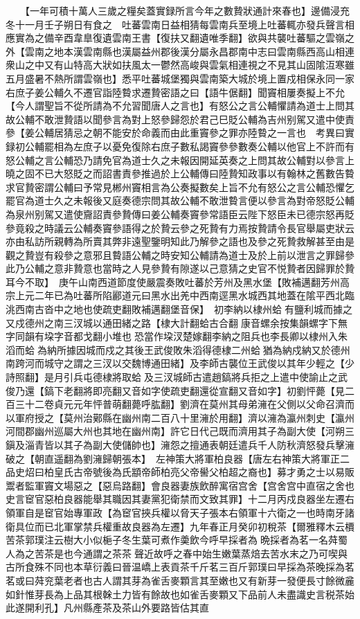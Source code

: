 　　【一年可積十萬人三歲之糧矣蓋實録所言今年之數贄狀通計來春也】邊備浸充　冬十一月壬子朔日有食之　吐蕃雲南日益相猜每雲南兵至境上吐蕃輒亦發兵聲言相應實為之備辛酉韋臯復遺雲南王書【復扶又翻遺唯季翻】欲與共襲吐蕃驅之雲嶺之外【雲南之地本漢雲南縣也漢屬益州郡後漢分屬永昌郡南中志曰雲南縣西高山相連衆山之中又有山特高大狀如扶風太一鬱然高峻與雲氣相連視之不見其山固隂沍寒雖五月盛暑不熱所謂雲嶺也】悉平吐蕃城堡獨與雲南築大城於境上置戍相保永同一家　右庶子姜公輔久不遷官詣陸䞇求遷贄密語之曰【語牛倨翻】聞竇相屢奏擬上不允【今人謂聖旨不從所請為不允習聞唐人之言也】有怒公之言公輔懼請為道士上問其故公輔不敢泄贄語以聞參言為對上怒參歸怨於君己巳貶公輔為吉州别駕又遣中使責參【姜公輔居猜忌之朝不能安於命義而由此重竇參之罪亦陸䞇之一言也　考異曰實録初公輔罷相為左庶子以憂免復除右庶子數私謁竇參參數奏公輔以他官上不許而有怒公輔之言公輔恐乃請免官為道士久之未報因開延英奏之上問其故公輔對以參言上曉之固不已大怒貶之而詔書責參推過於上公輔傳曰陸贄知政事以有翰林之舊數告䞇求官贄密謂公輔曰予常見郴州竇相言為公奏擬數矣上旨不允有怒公之言公輔恐懼乞罷官為道士久之未報後又庭奏德宗問其故公輔不敢泄䞇言便以參言為對帝怒貶公輔為泉州别駕又遣使齎詔責參贄傳曰姜公輔奏竇參常語臣云陛下怒臣未已德宗怒再貶參竟殺之時議云公輔奏竇參語得之於贄云參之死贄有力焉按贄請令長官舉屬吏狀云亦由私訪所親轉為所賣其弊非遠聖鑒明知此乃解參之語也及參之死贄救解甚至由是觀之贄豈有殺參之意邪且䞇語公輔之時安知公輔請為道士及於上前以泄言之罪歸參此乃公輔之意非贄意也當時之人見參贄有隙遂以己意猜之史官不悦贄者因歸罪於贄耳今不取】　庚午山南西道節度使嚴震奏敗吐蕃於芳州及黑水堡【敗補邁翻芳州高宗上元二年已為吐蕃所陷酈道元曰黑水出羌中西南逕黑水城西其地蓋在隂平西北臨洮西南古沓中之地也使疏吏翻敗補邁翻堡音保】　初李納以棣州蛤有鹽利城而據之又戍德州之南三汊城以通田緒之路【棣大計翻蛤古合翻康音螺余按集韻螺字下無字同韻有垜字音都戈翻小堆也恐當作垜汊楚嫁翻李納之阻兵也李長卿以棣州入朱滔而蛤為納所據因城而戍之其後王武俊敗朱滔得德棣二州蛤猶為納戍納又於德州南跨河而城守之謂之三汊以交魏博通田緒】及李師古襲位王武俊以其年少輕之【少詩照翻】是月引兵屯德棣將取蛤及三汊城師古遣趙鎬將兵拒之上遣中使諭止之武俊乃還【鎬下老翻將即亮翻又音如字使疏吏翻還從宣翻又音如字】初劉怦薨【見二百三十二卷貞元元年怦普萌翻薨呼肱翻】劉濟在莫州其母弟澭在父側以父命召濟而以軍府授之【莫州治鄚縣在幽州南二百八十里澭於用翻】濟以澭為瀛州刺史【瀛州河間郡幽州巡屬大州也其地在幽州南】許它日代己既而濟用其子為副大使【河朔三鎭及淄青皆以其子為副大使儲帥也】澭怨之擅通表朝廷遣兵千人防秋濟怒發兵擊澭破之【朝直遥翻為劉澭歸朝張本】　左神策大將軍柏良器【唐左右神策大將軍正二品史炤曰柏皇氏古帝號後為氏顓帝師柏亮父帝嚳父柏超之裔也】募才勇之士以易販鬻者監軍竇文場惡之【惡烏路翻】會良器妻族飲醉寓宿宫舍【宫舍宫中直宿之舍也史言䆠官惡柏良器能舉其職因其妻黨犯衛禁而文致其罪】十二月丙戍良器坐左遷右領軍自是䆠官始專軍政【為䆠官挾兵權以脅天子張本右領軍十六衛之一也時南牙諸衛具位而已北軍掌禁兵權重故良器為左遷】九年春正月癸卯初稅茶【爾雅釋木云檟苦茶郭璞注云樹大小似梔子冬生葉可煮作羮飲今呼早採者為晩採者為茗一名荈蜀人為之苦茶是也今通謂之茶茶聲近故呼之春中始生嫩葉蒸焙去苦水末之乃可喫與古所食殊不同也本草衍義曰晉温嶠上表貢茶千斤茗三百斤郭璞曰早採為茶晚採為茗茗或曰荈兖葉老者也古人謂其芽為雀舌麥顆言其至嫩也又有新芽一發便長寸餘微麄如針惟芽長為上品其根榦土力皆有餘故也如雀舌麥顆又下品前人未盡識史言税茶始此遂開利孔】凡州縣產茶及茶山外要路皆估其直